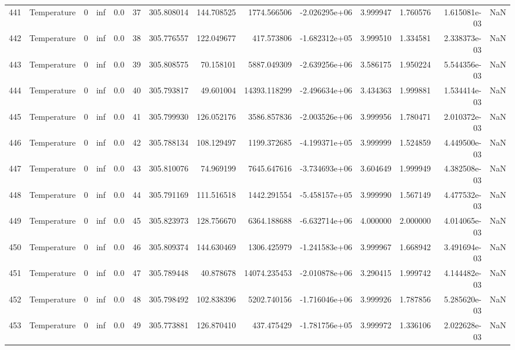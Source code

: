 \begin{tabular}{llrrrrrrrrrrrr}
441 &  Temperature &       0 &  inf &  0.0 &   37 &  305.808014 &   144.708525 &    1774.566506 & -2.026295e+06 &  3.999947 &  1.760576 &  1.615081e-03 &      NaN \\
442 &  Temperature &       0 &  inf &  0.0 &   38 &  305.776557 &   122.049677 &     417.573806 & -1.682312e+05 &  3.999510 &  1.334581 &  2.338373e-03 &      NaN \\
443 &  Temperature &       0 &  inf &  0.0 &   39 &  305.808575 &    70.158101 &    5887.049309 & -2.639256e+06 &  3.586175 &  1.950224 &  5.544356e-03 &      NaN \\
444 &  Temperature &       0 &  inf &  0.0 &   40 &  305.793817 &    49.601004 &   14393.118299 & -2.496634e+06 &  3.434363 &  1.999881 &  1.534414e-03 &      NaN \\
445 &  Temperature &       0 &  inf &  0.0 &   41 &  305.799930 &   126.052176 &    3586.857836 & -2.003526e+06 &  3.999956 &  1.780471 &  2.010372e-03 &      NaN \\
446 &  Temperature &       0 &  inf &  0.0 &   42 &  305.788134 &   108.129497 &    1199.372685 & -4.199371e+05 &  3.999999 &  1.524859 &  4.449500e-03 &      NaN \\
447 &  Temperature &       0 &  inf &  0.0 &   43 &  305.810076 &    74.969199 &    7645.647616 & -3.734693e+06 &  3.604649 &  1.999949 &  4.382508e-03 &      NaN \\
448 &  Temperature &       0 &  inf &  0.0 &   44 &  305.791169 &   111.516518 &    1442.291554 & -5.458157e+05 &  3.999990 &  1.567149 &  4.477532e-03 &      NaN \\
449 &  Temperature &       0 &  inf &  0.0 &   45 &  305.823973 &   128.756670 &    6364.188688 & -6.632714e+06 &  4.000000 &  2.000000 &  4.014065e-03 &      NaN \\
450 &  Temperature &       0 &  inf &  0.0 &   46 &  305.809374 &   144.630469 &    1306.425979 & -1.241583e+06 &  3.999967 &  1.668942 &  3.491694e-03 &      NaN \\
451 &  Temperature &       0 &  inf &  0.0 &   47 &  305.789448 &    40.878678 &   14074.235453 & -2.010878e+06 &  3.290415 &  1.999742 &  4.144482e-03 &      NaN \\
452 &  Temperature &       0 &  inf &  0.0 &   48 &  305.798492 &   102.838396 &    5202.740156 & -1.716046e+06 &  3.999926 &  1.787856 &  5.285620e-03 &      NaN \\
453 &  Temperature &       0 &  inf &  0.0 &   49 &  305.773881 &   126.870410 &     437.475429 & -1.781756e+05 &  3.999972 &  1.336106 &  2.022628e-03 &      NaN \\

\end{tabular}
